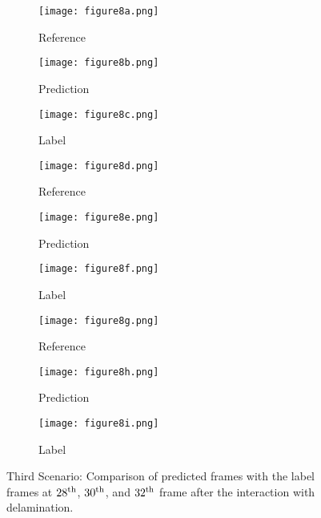 \begin{figure} [!ht]
	\centering
	\begin{subfigure}[b]{0.32\textwidth}
		\centering
		\texttt{[image: figure8a.png]}
		\caption{Reference}
		\label{fig:third_scenario_ref_28}
	\end{subfigure}
	\hfill
	\begin{subfigure}[b]{0.32\textwidth}
		\centering
		\texttt{[image: figure8b.png]}
		\caption{Prediction}
		\label{fig:third_scenario_pred_28}
	\end{subfigure}
	\hfill
	\begin{subfigure}[b]{0.32\textwidth}
		\centering
		\texttt{[image: figure8c.png]}
		\caption{Label}
		\label{fig:third_scenario_lab_28}
	\end{subfigure}	
	\hfill
	\begin{subfigure}[b]{0.32\textwidth}
		\centering
		\texttt{[image: figure8d.png]}
		\caption{Reference}
		\label{fig:third_scenario_ref_30}
	\end{subfigure}
	\hfill
	\begin{subfigure}[b]{0.32\textwidth}
		\centering
		\texttt{[image: figure8e.png]}
		\caption{Prediction}
		\label{fig:third_scenario_pred_30}
	\end{subfigure}
	\hfill
	\begin{subfigure}[b]{0.32\textwidth}
		\centering
		\texttt{[image: figure8f.png]}
		\caption{Label}
		\label{fig:third_scenario_lab_30}
	\end{subfigure}

		\hfill
	\begin{subfigure}[b]{0.32\textwidth}
		\centering
		\texttt{[image: figure8g.png]}
		\caption{Reference}
		\label{fig:third_scenario_ref_32}
	\end{subfigure}
	\hfill
	\begin{subfigure}[b]{0.32\textwidth}
		\centering
		\texttt{[image: figure8h.png]}
		\caption{Prediction}
		\label{fig:third_scenario_pred_32}
	\end{subfigure}
	\hfill
	\begin{subfigure}[b]{0.32\textwidth}
		\centering
		\texttt{[image: figure8i.png]}
		\caption{Label}
		\label{fig:third_scenario_lab_32}
	\end{subfigure}
	
	\caption{Third Scenario: Comparison of predicted frames with the label 
		frames at $28\textsuperscript{th}$, $30\textsuperscript{th}$, and 
		$32\textsuperscript{th}$ frame after the interaction with delamination.}
	\label{fig:third_scenario}
\end{figure}

